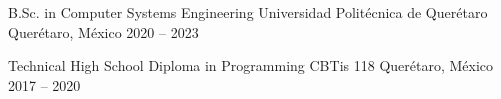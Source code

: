 
\education
{B.Sc. in Computer Systems Engineering}
{Universidad Politécnica de Querétaro}
{Querétaro, México}
{2020 -- 2023}

\education
{Technical High School Diploma in Programming}
{CBTis 118}
{Querétaro, México}
{2017 -- 2020}
